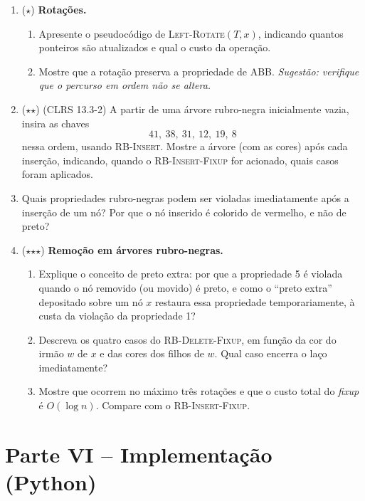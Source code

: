 \documentclass[10pt,a4paper]{extarticle}
\newcommand{\impt}[1]{\textcolor{important}{#1}}
\newcommand{\ntc}[1]{\textcolor{notice}{#1}}
\begin{document}
\begin{enumerate}[label=\textbf{\arabic*.}, leftmargin=*, start=13]

\item \ntc{($\star$)} \textbf{Rotações.}
  \begin{enumerate}[label=(\alph*)]
    \item Apresente o pseudocódigo de \textsc{Left-Rotate}$(T, x)$, indicando quantos ponteiros são atualizados e qual o custo da operação.
    \item Mostre que a rotação \impt{preserva a propriedade de ABB}. \emph{Sugestão: verifique que o percurso em ordem não se altera.}
  \end{enumerate}

\item \ntc{($\star$$\star$)} (CLRS 13.3-2) A partir de uma árvore rubro-negra inicialmente vazia, insira as chaves
\[
41,\ 38,\ 31,\ 12,\ 19,\ 8
\]
nessa ordem, usando \textsc{RB-Insert}. Mostre a árvore (\impt{com as cores}) após cada inserção, indicando, quando o \textsc{RB-Insert-Fixup} for acionado, quais casos foram aplicados.

\item Quais propriedades rubro-negras podem ser violadas imediatamente após a inserção de um nó? Por que o nó inserido é colorido de \impt{vermelho}, e não de preto?

\item \ntc{($\star$$\star$$\star$)} \textbf{Remoção em árvores rubro-negras.}
  \begin{enumerate}[label=(\alph*)]
    \item Explique o conceito de \impt{preto extra}: por que a propriedade 5 é violada quando o nó removido (ou movido) é preto, e como o ``preto extra'' depositado sobre um nó $x$ restaura essa propriedade temporariamente, à custa da violação da propriedade 1?
    \item Descreva os quatro casos do \textsc{RB-Delete-Fixup}, em função da cor do irmão $w$ de $x$ e das cores dos filhos de $w$. Qual caso encerra o laço imediatamente?
    \item Mostre que ocorrem \impt{no máximo três rotações} e que o custo total do \emph{fixup} é $O(\log n)$. Compare com o \textsc{RB-Insert-Fixup}.
  \end{enumerate}

\end{enumerate}

\section*{Parte VI -- Implementação (Python)}
\end{document}

